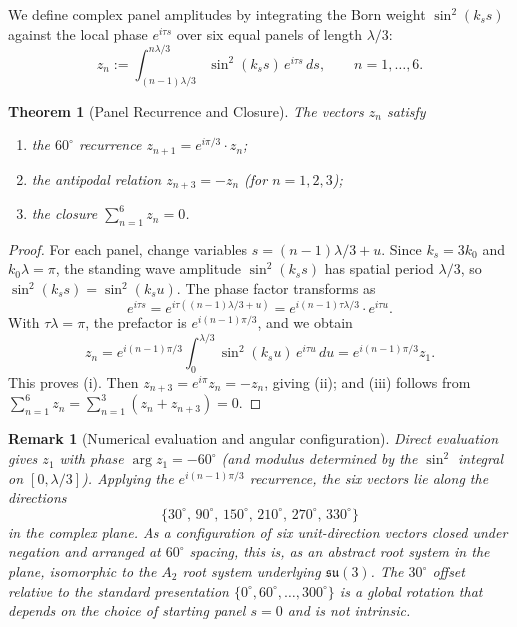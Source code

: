 \documentclass[11pt,a4paper]{article}
\newtheorem{theorem}{Theorem}
\newtheorem{remark}{Remark}
\begin{document}
We define complex panel amplitudes by integrating the Born weight $\sin^{2}(k_{s}s)$ against the local phase $e^{i\tau s}$ over six equal panels of length $\lambda/3$:
\begin{equation}
z_n := \int_{(n-1)\lambda/3}^{n\lambda/3} \sin^2(k_s s)\, e^{i\tau s}\, ds, \qquad n = 1, \dots, 6.
\end{equation}

\begin{theorem}[Panel Recurrence and Closure]
\label{thm:panels}
The vectors $z_n$ satisfy
\begin{enumerate}
\item the $60^\circ$ recurrence $z_{n+1} = e^{i\pi/3} \cdot z_n$;
\item the antipodal relation $z_{n+3} = -z_n$ (for $n=1,2,3$);
\item the closure $\sum_{n=1}^{6} z_n = 0$.
\end{enumerate}
\end{theorem}

\begin{proof}
For each panel, change variables $s = (n-1)\lambda/3 + u$. Since $k_s = 3 k_0$ and $k_0 \lambda = \pi$, the standing wave amplitude $\sin^{2}(k_{s}s)$ has spatial period $\lambda/3$, so $\sin^{2}(k_{s}s)=\sin^{2}(k_{s}u)$. The phase factor transforms as
\begin{equation*}
e^{i\tau s} = e^{i\tau((n-1)\lambda/3 + u)} = e^{i(n-1)\tau\lambda/3} \cdot e^{i\tau u}.
\end{equation*}
With $\tau\lambda = \pi$, the prefactor is $e^{i(n-1)\pi/3}$, and we obtain
\begin{equation*}
z_n = e^{i(n-1)\pi/3}\!\!\int_0^{\lambda/3}\!\! \sin^2(k_s u)\, e^{i\tau u}\, du = e^{i(n-1)\pi/3} z_1.
\end{equation*}
This proves (i). Then $z_{n+3}=e^{i\pi}z_{n}=-z_{n}$, giving (ii); and (iii) follows from $\sum_{n=1}^{6}z_{n}=\sum_{n=1}^{3}(z_{n}+z_{n+3})=0$.
\end{proof}

\begin{remark}[Numerical evaluation and angular configuration]
Direct evaluation gives $z_1$ with phase $\arg z_{1}=-60^\circ$ (and modulus determined by the $\sin^{2}$ integral on $[0,\lambda/3]$). Applying the $e^{i(n-1)\pi/3}$ recurrence, the six vectors lie along the directions
\begin{equation*}
\{30^\circ,\, 90^\circ,\, 150^\circ,\, 210^\circ,\, 270^\circ,\, 330^\circ\}
\end{equation*}
in the complex plane. As a configuration of six unit-direction vectors closed under negation and arranged at $60^\circ$ spacing, this is, as an abstract root system in the plane, isomorphic to the $A_{2}$ root system underlying $\mathfrak{su}(3)$. The $30^\circ$ offset relative to the standard presentation $\{0^\circ,60^\circ,\dots,300^\circ\}$ is a global rotation that depends on the choice of starting panel $s=0$ and is not intrinsic.
\end{remark}
\end{document}
